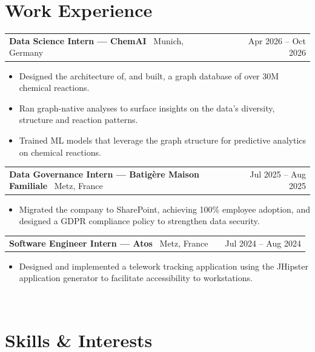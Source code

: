\documentclass[a4paper,10pt]{article}
\makeatletter
\newenvironment{joblong}[3]
    {
    \begin{tabularx}{\linewidth}{@{}l X r@{}}
    \textbf{#1} \textbar\ #2 & \hfill &  #3
    \end{tabularx}
    \begin{minipage}[t]{\linewidth}
    \begin{itemize}[nosep,after=\strut, leftmargin=1em, itemsep=0pt,label=--]
    }
    {
    \end{itemize}
    \end{minipage}
    }
\makeatother
\begin{document}
\section{Work Experience}

\begin{joblong}{Data Science Intern --- ChemAI}{Munich, Germany}{Apr 2026 -- Oct 2026}
\item Designed the architecture of, and built, a graph database of over 30M chemical reactions.
\item Ran graph-native analyses to surface insights on the data's diversity, structure and reaction patterns.
\item Trained ML models that leverage the graph structure for predictive analytics on chemical reactions.
\end{joblong}\vspace{-6pt}

\begin{joblong}{Data Governance Intern --- Batigère Maison Familiale}{Metz, France}{Jul 2025 -- Aug 2025}
\item Migrated the company to SharePoint, achieving 100\% employee adoption, and designed a GDPR compliance policy to strengthen data security.
\end{joblong}\vspace{-6pt}

\begin{joblong}{Software Engineer Intern --- Atos}{Metz, France}{Jul 2024 -- Aug 2024}
\item Designed and implemented a telework tracking application using the JHipster application generator to facilitate accessibility to workstations.
\end{joblong} \\[-16pt]

\section{Skills \& Interests}
\end{document}
